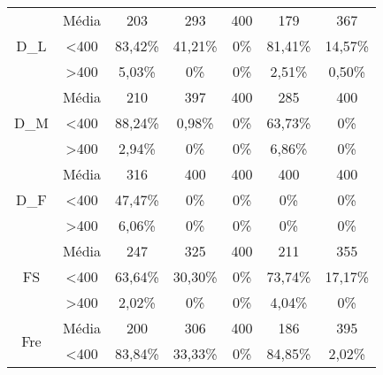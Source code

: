 \begin{table}[]
\begin{tabular}{|c|c|ccccc|}
\multirow{3}{*}{D\_L}           & Média            & 203               & 293               & 400               & 179               & 367               \\
                                & \textless 400    & 83,42\%           & 41,21\%           & 0\%            & 81,41\%           & 14,57\%           \\
                                & \textgreater 400 & 5,03\%            & 0\%            & 0\%            & 2,51\%            & 0,50\%            \\ \hline
\multirow{3}{*}{D\_M}           & Média            & 210               & 397               & 400               & 285               & 400               \\
                                & \textless 400    & 88,24\%           & 0,98\%            & 0\%            & 63,73\%           & 0\%            \\
                                & \textgreater 400 & 2,94\%            & 0\%            & 0\%            & 6,86\%            & 0\%            \\ \hline
\multirow{3}{*}{D\_F}           & Média            & 316               & 400               & 400               & 400               & 400               \\
                                & \textless 400    & 47,47\%           & 0\%            & 0\%            & 0\%            & 0\%            \\
                                & \textgreater 400 & 6,06\%            & 0\%            & 0\%            & 0\%            & 0\%            \\ \hline
\multirow{3}{*}{FS}             & Média            & 247               & 325               & 400               & 211               & 355               \\
                                & \textless 400    & 63,64\%           & 30,30\%           & 0\%            & 73,74\%           & 17,17\%           \\
                                & \textgreater 400 & 2,02\%            & 0\%            & 0\%            & 4,04\%            & 0\%            \\ \hline
\multirow{3}{*}{Fre}            & Média            & 200               & 306               & 400               & 186               & 395               \\
                                & \textless 400    & 83,84\%           & 33,33\%           & 0\%            & 84,85\%           & 2,02\%            \\

\end{tabular}
\end{table}
